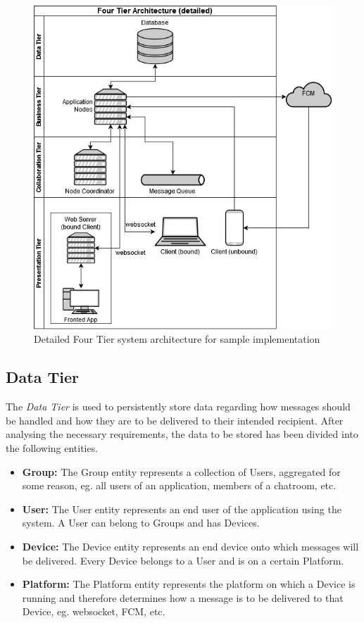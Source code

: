 \begin{figure}[!ht]
	\centering
	\includegraphics[width=1\textwidth]{figures/03_design/layer-arch-detail}
    \caption{Detailed Four Tier system architecture for sample implementation}
    \label{fig:s-impl-arch}
\end{figure}

\clearpage

\subsection{Data Tier} \label{design:data-layer}
The \textit{Data Tier} is used to persistently store data regarding how messages should be handled and how they are to be delivered to their intended recipient. After analysing the necessary requirements, the data to be stored has been divided into the following entities.
\begin{itemize}
\item \textbf{Group:} The Group entity represents a collection of Users, aggregated for some reason, eg. all users of an application, members of a chatroom, etc.
\item \textbf{User:} The User entity represents an end user of the application using the system. A User can belong to Groups and has Devices.
\item \textbf{Device:} The Device entity represents an end device onto which messages will be delivered. Every Device belongs to a User and is on a certain Platform.
\item \textbf{Platform:} The Platform entity represents the platform on which a Device is running and therefore determines how a message is to be delivered to that Device, eg. websocket, FCM, etc.
\end{itemize}

